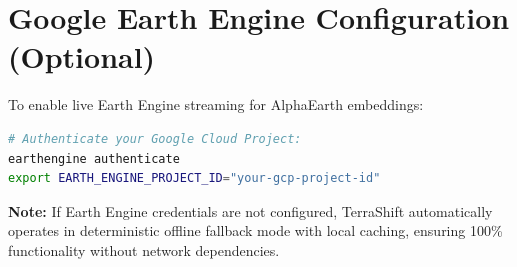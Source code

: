 \section{Google Earth Engine Configuration (Optional)}
\label{sec:deploy_gee}
To enable live Earth Engine streaming for AlphaEarth embeddings:
\begin{lstlisting}[language=bash]
# Authenticate your Google Cloud Project:
earthengine authenticate
export EARTH_ENGINE_PROJECT_ID="your-gcp-project-id"
\end{lstlisting}
\textbf{Note:} If Earth Engine credentials are not configured, TerraShift automatically operates in deterministic offline fallback mode with local caching, ensuring 100\% functionality without network dependencies.
\newpage

